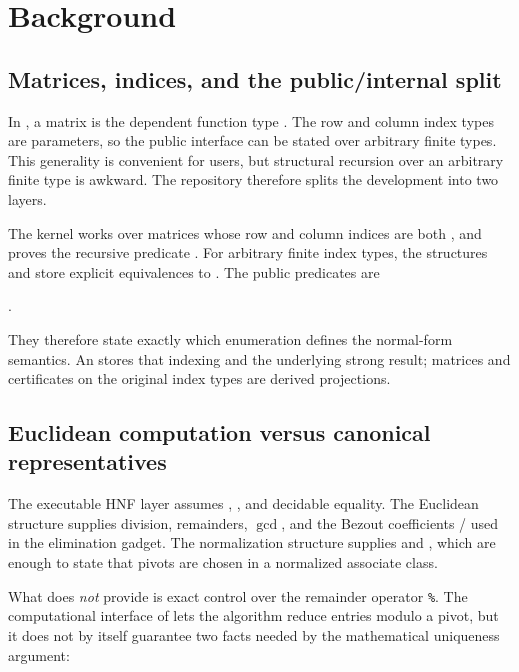 \section{Background}
\label{sec:background}

\subsection{Matrices, indices, and the public/internal split}

In \Lean{}, a matrix is the dependent function type . The row
and column index types are parameters, so the public interface can be stated over
arbitrary finite types. This generality is convenient for users, but structural
recursion over an arbitrary finite type is awkward. The repository therefore
splits the development into two layers.

The kernel works over matrices whose row and column indices are both
, and proves the recursive predicate
. For arbitrary finite index types,
the structures  and  store explicit
equivalences to . The public predicates are
\begin{center}
\qquad
{}.
\end{center}
They therefore state exactly which enumeration defines the normal-form
semantics. An  stores that indexing and the underlying strong
 result; matrices and certificates on the original index types are
derived projections.

\subsection{Euclidean computation versus canonical representatives}

The executable HNF layer assumes ,
, and decidable equality. The Euclidean structure
supplies division, remainders, \(\gcd\), and the Bezout coefficients
/ used in the elimination gadget. The normalization
structure supplies  and , which are enough to
state that pivots are chosen in a normalized associate class.

What  does \emph{not} provide is exact control over
the remainder operator \texttt{\%}. The computational interface of
 lets the algorithm reduce entries modulo a pivot, but it
does not by itself guarantee two facts needed by the mathematical uniqueness
argument:

